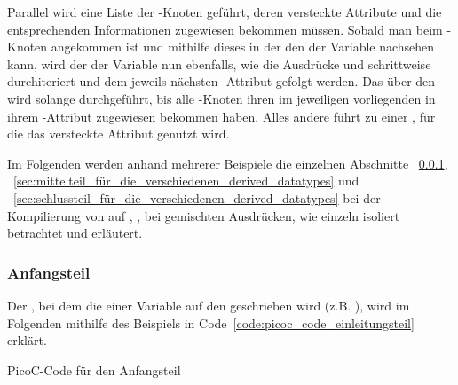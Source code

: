 \begin{Special_Paragraph}
Parallel wird eine Liste der -Knoten geführt, deren \textcolor{gray!90!black}{versteckte Attribute}  und  die entsprechenden Informationen zugewiesen bekommen müssen. Sobald man beim -Knoten angekommen ist und mithilfe dieses in der  den  der Variable nachsehen kann, wird der  der Variable nun ebenfalls, wie die Ausdrücke  und  schrittweise durchiteriert und dem jeweils nächsten -Attribut gefolgt werden. Das  über den  wird solange durchgeführt, bis alle -Knoten ihren im jeweiligen  vorliegenden  in ihrem -Attribut zugewiesen bekommen haben. Alles andere führt zu einer , für die das \textcolor{gray!90!black}{versteckte Attribut}  genutzt wird.
\end{Special_Paragraph}

Im Folgenden werden anhand mehrerer Beispiele die einzelnen Abschnitte ~\ref{sec:einleitungsteil_für_globale_statische_daten_und_stackframe}, ~\ref{sec:mittelteil_für_die_verschiedenen_derived_datatypes} und ~\ref{sec:schlussteil_für_die_verschiedenen_derived_datatypes} bei der Kompilierung von  auf , ,  bei gemischten Ausdrücken, wie  einzeln isoliert betrachtet und erläutert.

\subsubsection{Anfangsteil}
\label{sec:einleitungsteil_für_globale_statische_daten_und_stackframe}
Der , bei dem die  einer Variable auf den  geschrieben wird (z.B. ), wird im Folgenden mithilfe des Beispiels in Code~\ref{code:picoc_code_einleitungsteil} erklärt.

\begin{code}
  \centering
  \caption{PicoC-Code für den Anfangsteil}
  \label{code:picoc_code_einleitungsteil}
\end{code}

